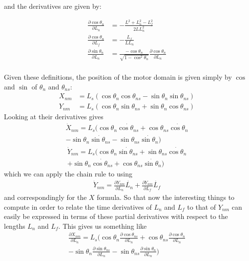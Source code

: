 \documentclass[11pt,twocolumn]{article}
\begin{document}
and the derivatives are given by:

\begin{align}
  \frac{\partial \cos\theta_n}{\partial L_n} &= -\frac{L^2 + L_n^2 - L_f^2}{2L L_n^2}\\
  \frac{\partial \cos\theta_n}{\partial L_f} &= -\frac{L_f}{LL_n}\\
  \frac{\partial \sin\theta_n}{\partial L_n} &= \frac{-\cos\theta_n}{\sqrt{1-\cos^2\theta_n}}
  \frac{\partial \cos\theta_n}{\partial L_n}\\
\end{align}

Given these definitions, the position of the motor domain is given
simply by $\cos$ and $\sin$ of $\theta_n$ and $\theta_{ns}$:
\begin{align}
  X_{nm} &= L_s\left(
  \cos\theta_n\cos\theta_{ns} - \sin\theta_n\sin\theta_{ns}
  \right)
  \\
  Y_{nm} &= L_s\left(
  \cos\theta_n\sin\theta_{ns} + \sin\theta_n\cos\theta_{ns}
  \right)
\end{align}
Looking at their derivatives gives
\begin{multline}
  \dot{X}_{nm} = L_s\Big(
  \cos\theta_n\dot{\cos\theta_{ns}} + \cos\theta_{ns}\dot{\cos\theta_{n}} \\
  - \sin\theta_n\dot{\sin\theta_{ns}} - \sin\theta_{ns}\dot{\sin\theta_{n}}
  \Big)
\end{multline}
\begin{multline}
  \dot{Y}_{nm} = L_s\Big(
  \cos\theta_n\dot{\sin\theta_{ns}} + \sin\theta_{ns}\dot{\cos\theta_{n}} \\
  + \sin\theta_n\dot{\cos\theta_{ns}} + \cos\theta_{ns}\dot{\sin\theta_{n}}
  \Big)
\end{multline}
which we can apply the chain rule to using
\begin{align}
  \dot{Y}_{nm} = \frac{\partial Y_{nm}}{\partial L_n} \dot{L_n}
  +  \frac{\partial Y_{nm}}{\partial L_{f}} \dot{L_{f}}
\end{align}
and correspondingly for the $X$ formula.  So that now the interesting
things to compute in order to relate the time derivatives of $L_n$ and
$L_f$ to that of $Y_{nm}$ can easily be expressed in terms of these
partial derivatives with respect to the lengths $L_n$ and $L_f$.  This
gives us something like
\begin{multline}
  \frac{\partial X_{nm}}{\partial L_n} = L_s\Bigg(
  \cos\theta_n\frac{\partial \cos\theta_{ns}}{\partial L_n}
  + \cos\theta_{ns}\frac{\partial \cos\theta_{n}}{\partial L_n} \\
  - \sin\theta_n\frac{\partial \sin\theta_{ns}}{\partial L_n}
  - \sin\theta_{ns}\frac{\partial \sin\theta_{n}}{\partial L_n}
  \Bigg)
\end{multline}
\end{document}
